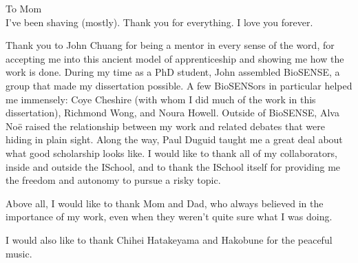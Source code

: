 \begin{frontmatter}

\begin{dedication}
\null\vfil
\begin{center}


To Mom\\\vspace{12pt} I've been shaving (mostly). Thank you for everything. I
love you forever.
\end{center}
\vfil\null
\end{dedication}


\tableofcontents
\clearpage
\listoffigures
\clearpage
\listoftables

\begin{acknowledgements}
Thank you to John Chuang for being a mentor in every sense of the word, for
accepting me into this ancient model of apprenticeship and showing me how the
work is done. During my time as a PhD student, John assembled BioSENSE, a group
that made my dissertation possible. A few BioSENSors in particular helped me
immensely: Coye Cheshire (with whom I did much of the work in this
dissertation), Richmond Wong, and Noura Howell. Outside of BioSENSE, Alva Noë
raised the relationship between my work and related debates that were hiding in
plain sight. Along the way, Paul Duguid taught me a great deal about what good
scholarship looks like. I would like to thank all of my collaborators, inside
and outside the ISchool, and to thank the ISchool itself for providing me the
freedom and autonomy to pursue a risky topic.

Above all, I would like to thank Mom and Dad, who always believed in the
importance of my work, even when they weren't quite sure what I was doing.

I would also like to thank Chihei Hatakeyama and Hakobune for the peaceful music.
\end{acknowledgements}
\end{frontmatter}
